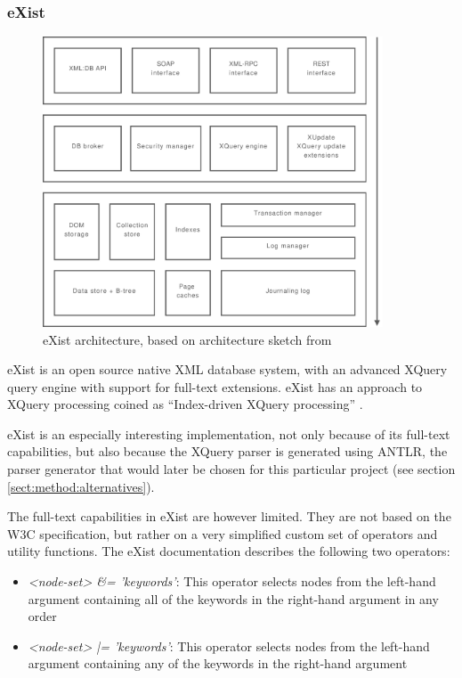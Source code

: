 \subsubsection{eXist}
\label{sect:stateOfTheArt:eXist}

\begin{figure}[!h]
  \centering
    \includegraphics[width=0.9\textwidth]{diagrams/exist_arch}
  \caption[eXist architecture]{eXist architecture, based on architecture sketch
  from \cite{exist_indexdriven}}
\end{figure}

eXist is an open source native XML database system, with an advanced XQuery
query engine with support for full-text extensions. eXist has an approach to
XQuery processing coined as ``Index-driven XQuery processing''
\cite{exist_idx_drv_query}.

eXist is an especially interesting implementation, not only because of its
full-text capabilities, but also because the XQuery parser is generated using
ANTLR, the parser generator that would later be chosen for this particular
project (see section \ref{sect:method:alternatives}).

The full-text capabilities in eXist are however limited. They are not based on
the W3C specification, but rather on a very simplified custom set of operators
and utility functions. The eXist documentation\cite{exist_doc} describes the
following two operators:

\begin{itemize}
  \item \emph{<node-set> \&= 'keywords'}: This operator selects nodes from the
  left-hand argument containing all of the keywords in the right-hand argument 
  in any order
  \item \emph{<node-set> |= 'keywords'}: This operator selects nodes from the
  left-hand argument containing any of the keywords in the right-hand argument
\end{itemize}

